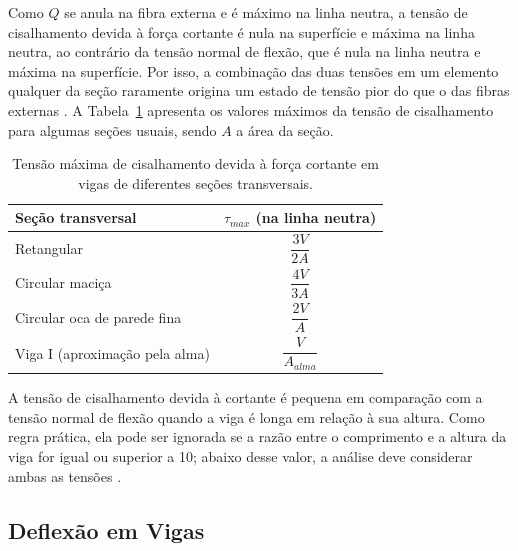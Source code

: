 \documentclass[arial,centeredequations,english,brazilian,oneside,section=TITLE]{ifes8}
\begin{document}
Como $Q$ se anula na fibra externa e é máximo na linha neutra, a tensão de
cisalhamento devida à força cortante é nula na superfície e máxima na linha neutra,
ao contrário da tensão normal de flexão, que é nula na linha neutra e máxima na
superfície. Por isso, a combinação das duas tensões em um elemento qualquer da seção
raramente origina um estado de tensão pior do que o das fibras externas
\cite{Norton2013}. A Tabela~\ref{tab:tau-max} apresenta os valores máximos
da tensão de cisalhamento para algumas seções usuais, sendo $A$ a área da seção.

\begin{table}[h]
  \caption{Tensão máxima de cisalhamento devida à força cortante em vigas de
    diferentes seções transversais.}
  \label{tab:tau-max}
  \begin{center}
    \begin{tabular}{lc}
      \toprule
      Seção transversal                   & $\tau_{max}$ (na linha neutra)  \\
      \midrule
      Retangular                          & $\dfrac{3V}{2A}$                \\[2ex]
      Circular maciça                     & $\dfrac{4V}{3A}$                \\[2ex]
      Circular oca de parede fina         & $\dfrac{2V}{A}$                 \\[2ex]
      Viga I (aproximação pela alma)      & $\dfrac{V}{A_{alma}}$           \\
      \bottomrule
    \end{tabular}
  \end{center}
\end{table}

A tensão de cisalhamento devida à cortante é pequena em comparação com a tensão
normal de flexão quando a viga é longa em relação à sua altura. Como regra prática,
ela pode ser ignorada se a razão entre o comprimento e a altura da viga for igual
ou superior a 10; abaixo desse valor, a análise deve considerar ambas as tensões
\cite{Norton2013}.

\subsection{Deflexão em Vigas}
\label{sub:deflexao-vigas}
\end{document}
